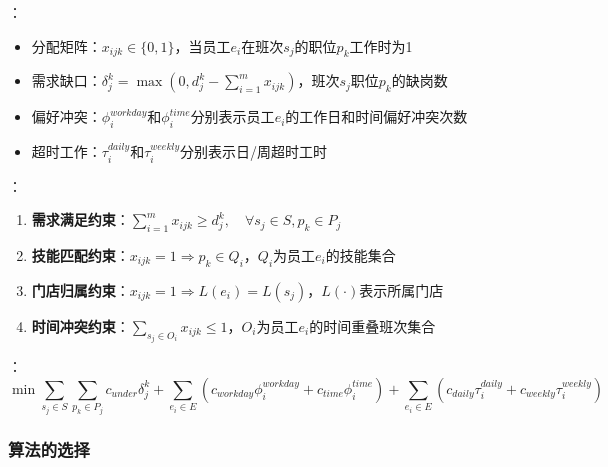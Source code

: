 \documentclass{ctexart}
\begin{document}
{}：
\begin{itemize}
    \item 分配矩阵：$x_{ijk} \in \{0,1\}$，当员工$e_i$在班次$s_j$的职位$p_k$工作时为1
    \item 需求缺口：$\delta_j^k = \max(0, d_j^k - \sum_{i=1}^m x_{ijk})$，班次$s_j$职位$p_k$的缺岗数
    \item 偏好冲突：$\phi_i^{workday}$和$\phi_i^{time}$分别表示员工$e_i$的工作日和时间偏好冲突次数
    \item 超时工作：$\tau_i^{daily}$和$\tau_i^{weekly}$分别表示日/周超时工时
\end{itemize}

{}：
\begin{enumerate}
    \item \textbf{需求满足约束}：$\sum_{i=1}^m x_{ijk} \geq d_j^k,\quad \forall s_j \in S, p_k \in P_j$
    \item \textbf{技能匹配约束}：$x_{ijk} = 1 \Rightarrow p_k \in Q_i$，$Q_i$为员工$e_i$的技能集合
    \item \textbf{门店归属约束}：$x_{ijk} = 1 \Rightarrow L(e_i) = L(s_j)$，$L(\cdot)$表示所属门店
    \item \textbf{时间冲突约束}：$\sum_{s_j \in O_i} x_{ijk} \leq 1$，$O_i$为员工$e_i$的时间重叠班次集合
\end{enumerate}

{}：
\begin{equation}
\min \sum_{s_j \in S}\sum_{p_k \in P_j} c_{under}\delta_j^k + 
\sum_{e_i \in E}\left(c_{workday}\phi_i^{workday} + c_{time}\phi_i^{time}\right) +
\sum_{e_i \in E}\left(c_{daily}\tau_i^{daily} + c_{weekly}\tau_i^{weekly}\right)
\end{equation}

\subsubsection{算法的选择}
\end{document}
